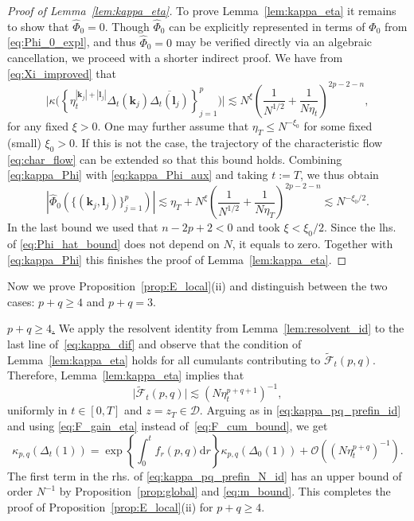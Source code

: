 \documentclass[10pt]{amsart}
\numberwithin{equation}{section}
\newcommand{\dif}{\mathrm{d}}
\begin{document}
\begin{proof}[Proof of Lemma~\ref{lem:kappa_eta}]
 To prove Lemma~\ref{lem:kappa_eta} it remains to show that $\widehat{\Phi}_0=0$. Though $\widehat{\Phi}_0$ can be explicitly represented in terms of $\Phi_0$ from \eqref{eq:Phi_0_expl}, and thus  $\widehat{\Phi}_0=0$ may
 be verified directly via an algebraic cancellation, we proceed with a shorter indirect proof. 
We have from \eqref{eq:Xi_improved} that
\begin{equation}
\Big|\kappa\Big(\left\lbrace \eta_t^{|\bm{k}_j|+|\bm{l}_j|}\Delta_t(\bm{k}_j)\overline{\Delta_t(\bm{l}_j)}\right\rbrace_{j=1}^p\Big)\Big|\lesssim N^\xi\left(\frac{1}{N^{1/2}} + \frac{1}{N\eta_t}\right)^{2p-2-n},
\label{eq:kappa_Phi_aux}
\end{equation}
for any fixed $\xi>0$. One may further assume that $\eta_T \le N^{-\xi_0}$ for some fixed (small) $\xi_0>0$. If this is not the case, the trajectory of the characteristic flow \eqref{eq:char_flow} can be extended so that this bound holds. Combining \eqref{eq:kappa_Phi} with \eqref{eq:kappa_Phi_aux} and taking $t:=T$, we thus obtain
\begin{equation}
\left\vert \widehat{\Phi}_0\left(\{(\bm{k}_j,\bm{l}_j)\}_{j=1}^p\right)\right\vert \lesssim \eta_T + N^\xi\left(\frac{1}{N^{1/2}} + \frac{1}{N\eta_T}\right)^{2p-2-n}\lesssim N^{-\xi_0/2}.
\label{eq:Phi_hat_bound}
\end{equation}
In the last bound we used that $n-2p+2<0$ and took $\xi<\xi_0/2$. Since the lhs. of \eqref{eq:Phi_hat_bound} does not depend on $N$, it equals to zero. Together with \eqref{eq:kappa_Phi} this finishes the proof of Lemma~\ref{lem:kappa_eta}.
\end{proof}


Now we prove Proposition~\ref{prop:E_local}(ii) and distinguish between the two cases: $p+q\ge 4$ and $p+q=3$.

\smallskip

\noindent\underline{$p+q\ge 4$.} We apply the resolvent identity from Lemma~\ref{lem:resolvent_id} to the last line of~\eqref{eq:kappa_dif} and observe that the condition of Lemma~\ref{lem:kappa_eta} holds for all cumulants contributing to $\widetilde{\mathcal{F}}_t(p,q)$. Therefore, Lemma~\ref{lem:kappa_eta} implies that
\begin{equation}
\big|\widetilde{\mathcal{F}}_t(p,q)\big| \lesssim \left(N\eta_t^{p+q+1}\right)^{-1},
\label{eq:F_gain_eta}
\end{equation}
uniformly in $t\in [0,T]$ and $z=z_T\in\mathcal{D}$.  Arguing as in \eqref{eq:kappa_pq_prefin_id} and using \eqref{eq:F_gain_eta} instead of~\eqref{eq:F_cum_bound}, we get
\begin{equation}
\kappa_{p,q}(\Delta_t(1)) = \exp\left\lbrace \int_0^t f_r(p,q)\dif r\right\rbrace \kappa_{p,q}(\Delta_0(1)) + \mathcal{O}\left((N\eta_t^{p+q})^{-1}\right).
\label{eq:kappa_pq_prefin_N_id}
\end{equation}
The first term in the rhs. of \eqref{eq:kappa_pq_prefin_N_id} has an upper bound of order $N^{-1}$ by Proposition~\ref{prop:global} and \eqref{eq:m_bound}. This completes the proof of Proposition~\ref{prop:E_local}(ii) for $p+q\ge 4$.
\end{document}
